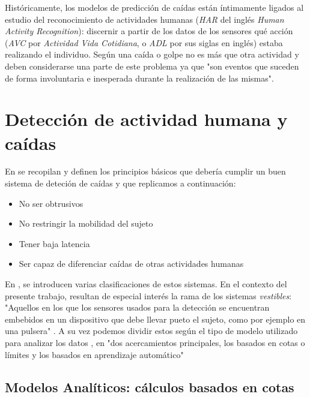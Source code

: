 \documentclass[../tfm.tex]{subfiles}
\begin{document}
Históricamente, los modelos de predicción de caídas están íntimamente ligados al estudio del reconocimiento de actividades humanas (\textit{HAR} del inglés \textit{Human Activity Recognition}): discernir a partir de los datos de los sensores qué acción (\textit{AVC} por \textit{Actividad Vida Cotidiana}, o \textit{ADL} por sus siglas en inglés) estaba realizando el individuo. Según \cite[p.10692]{Ozdemir2014} una caída o golpe no es más que otra actividad y deben considerarse una parte de este problema ya que "son eventos que suceden de forma involuntaria e inesperada durante la realización de las mismas".


\section{Detección de actividad humana y caídas}\label{sect:sa_har}

En \cite[p.2]{Anita2020} se recopilan y definen los principios básicos que debería cumplir un buen sistema de deteción de caídas y que replicamos a continuación:

\begin{itemize}
  \item No ser obtrusivos
  \item No restringir la mobilidad del sujeto
  \item Tener baja latencia
  \item Ser capaz de diferenciar caídas de otras actividades humanas
\end{itemize}

En \cite{Musci2020,Anita2020}, se introducen varias clasificaciones de estos sistemas. En el contexto del presente trabajo, resultan de especial interés la rama de los sistemas \textit{vestibles}: "Aquellos en los que los sensores usados para la detección se encuentran embebidos en un dispositivo que debe llevar pueto el sujeto, como por ejemplo en una pulsera" \cite[p.3]{Anita2020}. A su vez podemos dividir estos según el tipo de modelo utilizado para analizar los datos \cite{Anita2020,Lim2014}, en "dos acercamientos principales, los basados en cotas o límites y los basados en aprendizaje automático"\cite[p.1]{Lim2014}

\subsection{Modelos Analíticos: cálculos basados en cotas}\label{sa_modelos_analiticos}
\end{document}
